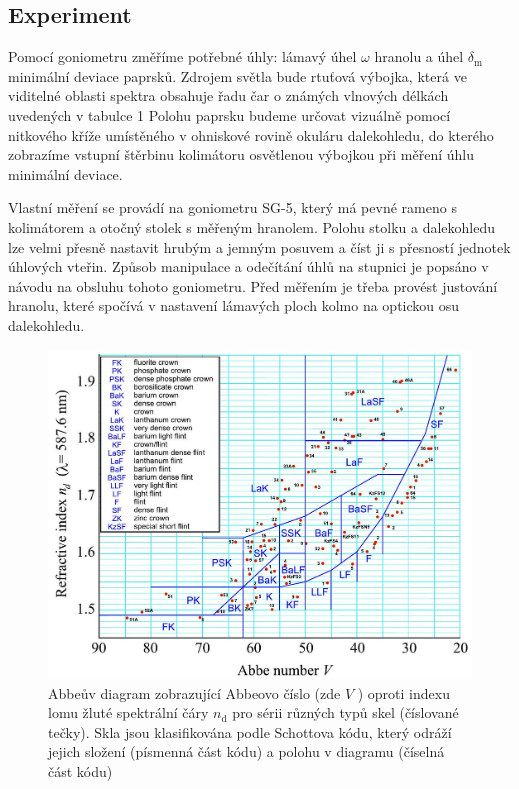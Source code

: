 \documentclass[czech,11pt,a4paper]{article}
\begin{document}
\begin{multicols}{2}
\section*{Experiment}
Pomocí goniometru změříme potřebné úhly: lámavý úhel $\omega$ hranolu a úhel $\delta_{\mathrm{m}}$ minimální deviace paprsků. Zdrojem světla bude rtuťová výbojka, která ve viditelné oblasti spektra obsahuje řadu čar o známých vlnových délkách uvedených v tabulce 1 Polohu paprsku budeme určovat vizuálně pomocí nitkového kříže umístěného v ohniskové rovině okuláru dalekohledu, do kterého zobrazíme vstupní štěrbinu kolimátoru osvětlenou výbojkou při měření úhlu minimální deviace.

Vlastní měření se provádí na goniometru SG-5, který má pevné rameno s kolimátorem a otočný stolek s měřeným hranolem. Polohu stolku a dalekohledu lze velmi přesně nastavit hrubým a jemným posuvem a číst ji s přesností jednotek úhlových vteřin. Způsob manipulace a odečítání úhlů na stupnici je popsáno v návodu na obsluhu tohoto goniometru. Před měřením je třeba provést justování hranolu, které spočívá v nastavení lámavých ploch kolmo na optickou osu dalekohledu.\\
\begin{figure}[H]
	\includegraphics[max width=0.95\linewidth, center]{2024_12_03_db7ee7d12aab7219c185g-4(1)}
	\caption{Abbeův diagram zobrazující Abbeovo číslo (zde $V$ ) oproti indexu lomu žluté spektrální čáry $n_{\mathrm{d}}$ pro sérii různých typů skel (číslované tečky). Skla jsou klasifikována podle Schottova kódu, který odráží jejich složení (písmenná část kódu) a polohu v diagramu (číselná část kódu)}
\end{figure}
 


\end{multicols}
\end{document}
